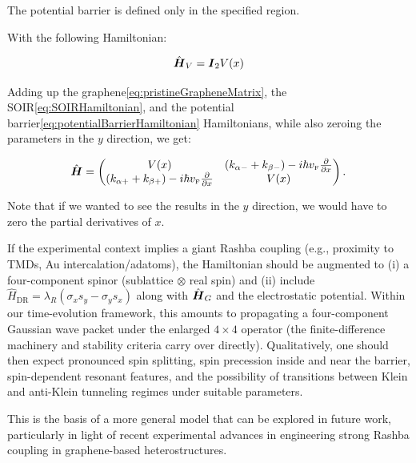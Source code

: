 The potential barrier is defined only in the specified region.

With the following Hamiltonian:

\begin{equation}
    \label{eq:potentialBarrierHamiltonian}
    \hat{\mbox{\boldmath $H$}}_V=\mbox{\boldmath $I$}_2 V(x)
\end{equation}

Adding up the graphene\eqref{eq:pristineGrapheneMatrix}, the SOIR\eqref{eq:SOIRHamiltonian}, and the potential barrier\eqref{eq:potentialBarrierHamiltonian} Hamiltonians, while also zeroing the parameters in the $y$ direction, we get:

\begin{equation}
    \label{eq:hybridHamiltonian}
    \hat{\mbox{\boldmath $H$}}=
    \begin{pmatrix}
        V(x) & \left(k_{\alpha-}+k_{\beta-}\right)-i\hbar v_{\mbox{\tiny F}}\frac{\partial}{\partial x} \\
        \left(k_{\alpha+}+k_{\beta+}\right)-i\hbar v_{\mbox{\tiny F}}\frac{\partial}{\partial x} & V(x)
    \end{pmatrix}.
\end{equation}

Note that if we wanted to see the results in the $y$ direction, we would have to zero the partial derivatives of $x$.

If the experimental context implies a giant Rashba coupling (e.g., proximity to TMDs, Au intercalation/adatoms), the Hamiltonian should be augmented to
(i) a four-component spinor (sublattice $\otimes$ real spin) and
(ii) include $\hat{H}_{\mathrm{DR}}=\lambda_R(\sigma_x s_y-\sigma_y s_x)$ along with $\hat{\mbox{\boldmath $H$}}_G$ and the electrostatic potential.
Within our time-evolution framework, this amounts to propagating a four-component Gaussian wave packet under the enlarged $4\times 4$ operator (the finite-difference machinery and stability criteria carry over directly).
Qualitatively, one should then expect pronounced spin splitting, spin precession inside and near the barrier, spin-dependent resonant features, and the possibility of transitions between Klein and anti-Klein tunneling regimes under suitable parameters\cite{DellAnnaJPhysCondMatt2018, AvsarNatCommun2014, WangPhysRevX2016}.

This is the basis of a more general model that can be explored in future work, particularly in light of recent experimental advances in engineering strong Rashba coupling in graphene-based heterostructures\cite{ManchonNatureMater2015}.

